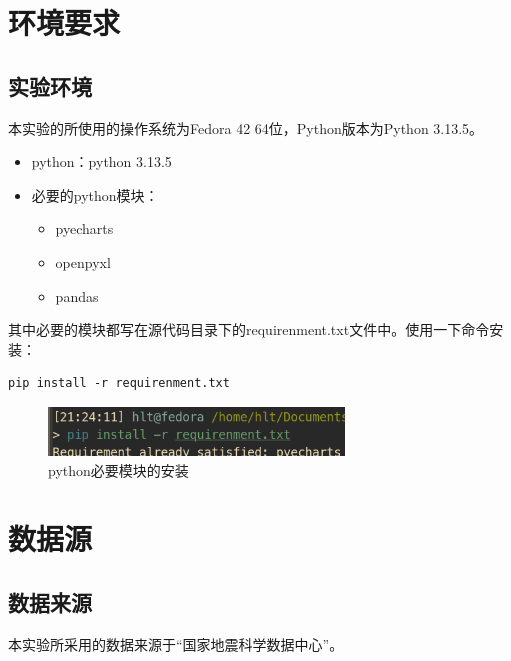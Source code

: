 \section{环境要求}

\subsection{实验环境}
本实验的所使用的操作系统为Fedora 42 64位，Python版本为Python 3.13.5。
\begin{itemize}
    \item python：python 3.13.5
    \item 必要的python模块：
        \begin{itemize}
            \item pyecharts
            \item openpyxl
            \item pandas
        \end{itemize}
\end{itemize}

其中必要的模块都写在源代码目录下的requirenment.txt文件中。使用一下命令安装：

\begin{lstlisting}[language=fish]
pip install -r requirenment.txt
\end{lstlisting}

\begin{figure}[H]
        \centering
        \includegraphics[width=0.7\textwidth]{./asserts/install_packages.png}
        \caption{python必要模块的安装}
\end{figure}

\section{数据源}

\subsection{数据来源}
本实验所采用的数据来源于“国家地震科学数据中心”。
